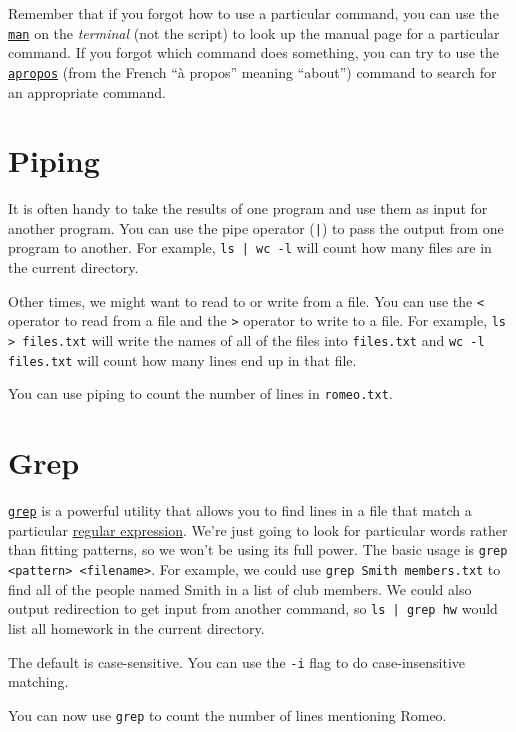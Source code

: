 \documentclass[12pt]{article}
\newcommand{\code}[1]{\texttt{#1}}
\begin{document}
Remember that if you forgot how to use a particular command, you can use the \href{https://en.wikipedia.org/wiki/Man_page}{\code{man}} on the \emph{terminal} (not the script) to look up the manual page for a particular command.
If you forgot which command does something, you can try to use the \href{https://en.wikipedia.org/wiki/Apropos_(Unix)}{\code{apropos}} (from the French ``\`{a} propos'' meaning ``about'') command to search for an appropriate command.

\section*{Piping}
It is often handy to take the results of one program and use them as input for another program.
You can use the pipe operator (\code{|}) to pass the output from one program to another.
For example, \code{ls | wc -l} will count how many files are in the current directory.

Other times, we might want to read to or write from a file.
You can use the \code{<} operator to read from a file and the \code{>} operator to write to a file.
For example, \code{ls > files.txt} will write the names of all of the files into \code{files.txt} and \code{wc -l files.txt} will count how many lines end up in that file.

You can use piping to count the number of lines in \code{romeo.txt}.

\section*{Grep}

\href{https://en.wikipedia.org/wiki/Grep}{\code{grep}} is a powerful utility that allows you to find lines in a file that match a particular \href{https://en.wikipedia.org/wiki/Regular_expression}{regular expression}.
We're just going to look for particular words rather than fitting patterns, so we won't be using its full power.
The basic usage is \code{grep <pattern> <filename>}.
For example, we could use \code{grep Smith members.txt} to find all of the people named Smith in a list of club members.
We could also output redirection to get input from another command, so \code{ls | grep hw} would list all homework in the current directory.

The default is case-sensitive.
You can use the \code{-i} flag to do case-insensitive matching.

You can now use \code{grep} to count the number of lines mentioning Romeo.
\end{document}
